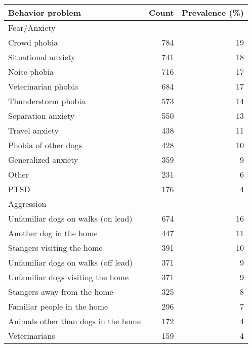 \documentclass[varwidth=\maxdimen]{standalone}
\newcommand{\subrow}[1]{\hspace{1.25em}#1}
\begin{document}
\begin{tabular}[t]{lrr}
\toprule
Behavior problem &  Count &  Prevalence (\%) \\
\midrule
Fear/Anxiety \\
  \subrow{Crowd phobia}                        &      784 &              19 \\
  \subrow{Situational anxiety}                 &      741 &              18 \\
  \subrow{Noise phobia}                        &      716 &              17 \\
  \subrow{Veterinarian phobia}                 &      684 &              17 \\
  \subrow{Thunderstorm phobia}                 &      573 &              14 \\
  \subrow{Separation anxiety}                  &      550 &              13 \\
  \subrow{Travel anxiety}                      &      438 &              11 \\
  \subrow{Phobia of other dogs}                &      428 &              10 \\
  \subrow{Generalized anxiety}                 &      359 &               9 \\
  \subrow{Other}                               &      231 &               6 \\
  \subrow{PTSD}                                &      176 &               4 \\
Aggression \\
  \subrow{Unfamiliar dogs on walks (on lead)}  &      674 &              16 \\
  \subrow{Another dog in the home}             &      447 &              11 \\
  \subrow{Stangers visiting the home}          &      391 &              10 \\
  \subrow{Unfamiliar dogs on walks (off lead)} &      371 &               9 \\
  \subrow{Unfamiliar dogs visiting the home}   &      371 &               9 \\
  \subrow{Stangers away from the home}         &      325 &               8 \\
  \subrow{Familiar people in the home}         &      296 &               7 \\
  \subrow{Animals other than dogs in the home} &      172 &               4 \\
  \subrow{Veterinarians}                       &      159 &               4 \\

\end{tabular}
\end{document}
